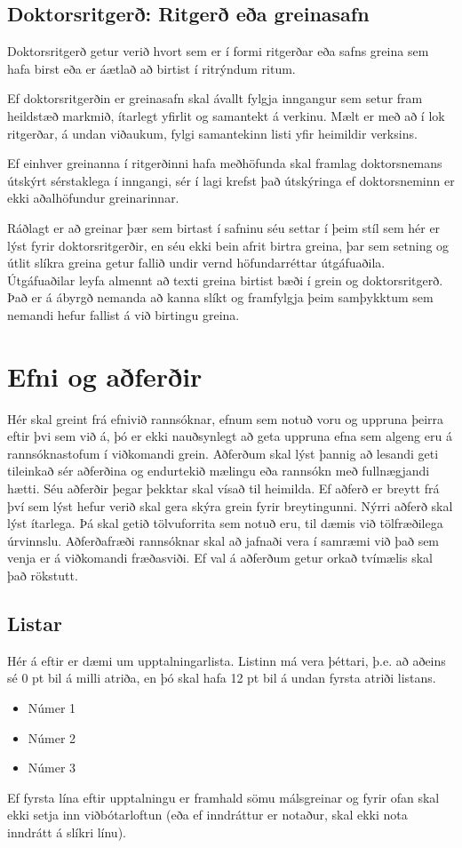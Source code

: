 \documentclass[a4paper,12pt,twoside,BCOR=10mm]{scrbook}
\begin{document}
\section{Doktorsritgerð: Ritgerð eða greinasafn}
Doktorsritgerð getur verið hvort sem er í formi ritgerðar eða safns greina sem hafa birst eða  er áætlað að birtist í ritrýndum ritum. 

Ef doktorsritgerðin er greinasafn skal ávallt fylgja inngangur sem setur fram heildstæð markmið, ítarlegt yfirlit og samantekt á verkinu. Mælt er með að í lok ritgerðar, á undan viðaukum, fylgi samantekinn listi yfir heimildir verksins.

Ef einhver greinanna í ritgerðinni hafa meðhöfunda skal framlag doktorsnemans útskýrt sérstaklega í inngangi, sér í lagi krefst það útskýringa ef doktorsneminn er ekki aðalhöfundur greinarinnar. 

Ráðlagt er að greinar þær sem birtast í safninu séu settar í þeim stíl sem hér er lýst fyrir doktorsritgerðir, en séu ekki bein afrit birtra greina, þar sem setning og útlit slíkra greina getur fallið undir vernd höfundarréttar útgáfuaðila. Útgáfuaðilar leyfa almennt að texti greina birtist bæði í grein og doktorsritgerð. Það er á ábyrgð nemanda að kanna slíkt og framfylgja þeim samþykktum sem nemandi hefur fallist á við birtingu greina.
 
\chapter{Efni og aðferðir}
Hér skal greint frá efnivið rannsóknar, efnum sem notuð voru og uppruna þeirra eftir þvi sem við á, þó er ekki nauðsynlegt að geta uppruna efna sem algeng eru á rannsóknastofum í viðkomandi grein. Aðferðum skal lýst þannig að lesandi geti tileinkað sér aðferðina og endurtekið mælingu eða rannsókn með fullnægjandi hætti. Séu aðferðir þegar þekktar skal vísað til heimilda. Ef aðferð er breytt frá því sem lýst hefur verið skal gera skýra grein fyrir breytingunni. Nýrri aðferð skal lýst ítarlega. Þá skal getið tölvuforrita sem notuð eru, til dæmis við tölfræðilega úrvinnslu. Aðferðafræði rannsóknar skal að jafnaði vera í samræmi við það sem venja er á viðkomandi fræðasviði. Ef val á aðferðum getur orkað tvímælis skal það rökstutt.

\section{Listar}
Hér á eftir er dæmi um upptalningarlista. Listinn má vera þéttari, þ.e. að aðeins sé 0 pt bil á milli atriða, en þó skal hafa 12 pt bil á undan fyrsta atriði listans.
\begin{itemize}
 \item Númer 1
 \item Númer 2
 \item Númer 3
\end{itemize}
Ef fyrsta lína eftir upptalningu er framhald sömu málsgreinar og fyrir ofan skal ekki setja inn viðbótarloftun (eða ef inndráttur er notaður, skal ekki nota inndrátt á slíkri línu). 
\end{document}
